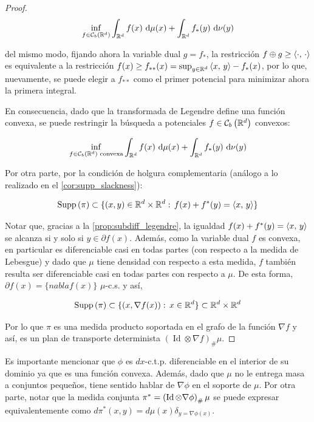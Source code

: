 \begin{proof}
	\begin{equation}
		\inf_{f\in \mathcal{C}_b\left(\mathbb{R}^d\right)}
		\int_{\mathbb{R}^d} f(x) \,\operatorname{d}\!\mu(x) + \int_{\mathbb{R}^d} f_*(y) \,\operatorname{d}\!\nu(y)
	\end{equation}

	del mismo modo, fijando ahora la variable dual $g=f_*$, la restricción $f\oplus g \geq \left\langle \cdot,\,\cdot\right\rangle$ es equivalente a la restricción $f(x) \geq f_{**}(x) = \sup_{y\in\mathbb{R}^d} \left\langle x,\,y\right\rangle - f_*(x)$, por lo que, nuevamente, se puede elegir a $f_{**}$ como el primer potencial para minimizar ahora la primera integral.

	En consecuencia, dado que la transformada de Legendre define una función convexa, se puede restringir la búsqueda a potenciales $f\in \mathcal{C}_b\left(\mathbb{R}^d\right)$ convexos:

	\begin{equation}
		\inf_{f\in \mathcal{C}_b\left(\mathbb{R}^d\right)\text{ convexa}}
		\int_{\mathbb{R}^d} f(x) \,\operatorname{d}\!\mu(x) + \int_{\mathbb{R}^d} f_*(y) \,\operatorname{d}\!\nu(y)
	\end{equation}

	Por otra parte, por la condición de holgura complementaria (análogo a lo realizado en el \autoref{cor:supp_slackness}):

	\begin{equation}
		\operatorname{Supp}\left(\pi\right)
		\subset \{(x,y)\in\mathbb{R}^d\times\mathbb{R}^d:\, f(x) + f^*(y) = \left\langle x,\,y\right\rangle\}
	\end{equation}

	Notar que, gracias a la \autoref{prop:subdiff_legendre}, la igualdad $f(x) + f^*(y) = \left\langle x,\,y\right\rangle$ se alcanza si y solo si $y\in\partial f(x)$. Además, como la variable dual $f$ es convexa, en particular es diferenciable casi en todas partes (con respecto a la medida de Lebesgue) y dado que $\mu$ tiene densidad con respecto a esta medida, $f$ también resulta ser diferenciable casi en todas partes con respecto a $\mu$. De esta forma, $\partial f(x) = \{nabla f(x)\}$ $\mu$-c.s. y así,

	\begin{equation}
		\operatorname{Supp}\left(\pi\right)
		\subset \{(x,\nabla f(x)):\,x\in\mathbb{R}^d\} \subset \mathbb{R}^d\times\mathbb{R}^d
	\end{equation}

	Por lo que $\pi$ es una medida producto soportada en el grafo de la función $\nabla f$ y así, es un plan de transporte determinista $(\operatorname{Id}\otimes\nabla f)_\# \mu$.
\end{proof}

Es importante mencionar que $\phi$ es $dx$-c.t.p. diferenciable en el interior de su dominio ya que es una función convexa. Además, dado que $\mu$ no le entrega masa a conjuntos pequeños, tiene sentido hablar de $\nabla\phi$ en el soporte de $\mu$. Por otra parte, notar que la medida conjunta $\pi^* = \left(\operatorname{Id}\otimes \nabla\phi\right)_\#\mu$ se puede expresar equivalentemente como $d\pi^*(x,y) = d\mu(x)\delta_{y=\nabla\phi(x)}$.

